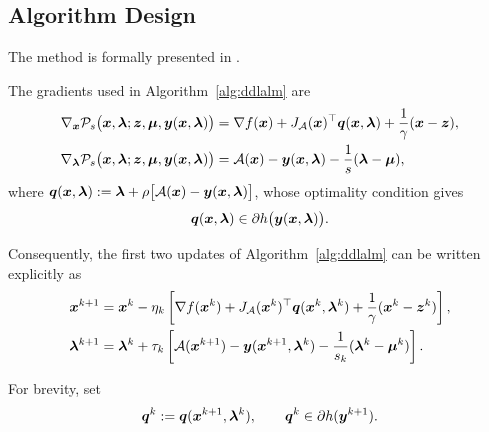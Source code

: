 \subsection{Algorithm Design}
\label{subsec:ddlalm-algorithm}
The method is formally presented in .

The gradients used in Algorithm~\ref{alg:ddlalm} are
\begin{equation}\label{eq:explicit-p-gradients}
    \begin{aligned}
        \nabla_{\bm{x}}\mathcal P_s
        \bigl(\bm{x},\bm{\lambda};\bm{z},\bm{\mu},\bm{y}(\bm{x},\bm{\lambda})\bigr)
        &=
        \nabla f(\bm{x})
        +J_{\mathcal{A}}(\bm{x})^\top\bm{q}(\bm{x},\bm{\lambda})
        +\frac{1}{\gamma}(\bm{x}-\bm{z}), \\
        \nabla_{\bm{\lambda}}\mathcal P_s
        \bigl(\bm{x},\bm{\lambda};\bm{z},\bm{\mu},\bm{y}(\bm{x},\bm{\lambda})\bigr)
        &=
        \mathcal{A}(\bm{x})-\bm{y}(\bm{x},\bm{\lambda})
        -\frac{1}{s}(\bm{\lambda}-\bm{\mu}),
    \end{aligned}
\end{equation} where $ \bm{q}(\bm{x},\bm{\lambda}) := \bm{\lambda}+\rho\bigl[\mathcal{A}(\bm{x})-\bm{y}(\bm{x},\bm{\lambda})\bigr]$, whose  optimality condition gives
\begin{equation}
    \bm{q}(\bm{x},\bm{\lambda})
    \in\partial h\bigl(\bm{y}(\bm{x},\bm{\lambda})\bigr).
    \label{eq:certificate-membership}
\end{equation}

Consequently, the first two updates of
Algorithm~\ref{alg:ddlalm} can be written explicitly as
\begin{equation}\label{eq:explicit-updates}
    \begin{aligned}
        \bm{x}^{k+1}
        &=
        \bm{x}^k-\eta_k
        \left[
            \nabla f(\bm{x}^k)
            +J_{\mathcal{A}}(\bm{x}^k)^\top\bm{q}(\bm{x}^k,\bm{\lambda}^k)
            +\frac{1}{\gamma}(\bm{x}^k-\bm{z}^k)
        \right], \\
        \bm{\lambda}^{k+1}
        &=
        \bm{\lambda}^k+\tau_k
        \left[
            \mathcal{A}(\bm{x}^{k+1})
            -\bm{y}(\bm{x}^{k+1},\bm{\lambda}^k)
            -\frac{1}{s_k}(\bm{\lambda}^k-\bm{\mu}^k)
        \right].
    \end{aligned}
\end{equation}

For brevity, set
\[
    \bm{q}^k:=\bm{q}(\bm{x}^{k+1},\bm{\lambda}^k),
    \qquad
    \bm{q}^k\in\partial h(\bm{y}^{k+1}).
\]

